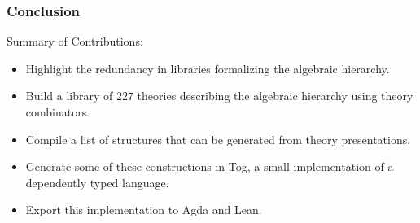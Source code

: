 \documentclass[t,10pt,numbers,fleqn,usenames,xcolor=dvipsnames]{beamer}
\begin{document}
\begin{frame}[fragile] 
\frametitle{Conclusion} 
Summary of Contributions: 
\begin{itemize}
\item Highlight the redundancy in libraries formalizing the algebraic hierarchy.
\item Build a library of $227$ theories describing the algebraic hierarchy using theory combinators.
\item Compile a list of structures that can be generated from theory presentations.
\item Generate some of these constructions in Tog, a small implementation of a dependently typed language.
\item Export this implementation to Agda and Lean.
\end{itemize}
\end{frame}
\end{document}
